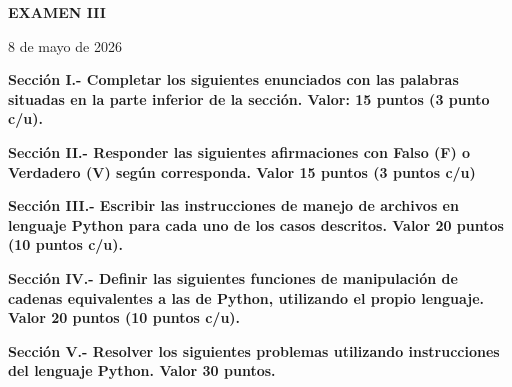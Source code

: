 \documentclass[10pt,addpoints]{exam}
\begin{document}
\begin{center}
  \sffamily\textbf{EXAMEN III}
\end{center}
\begin{flushright}
8 de mayo de 2026
\end{flushright}

\begin{questions}
\begin{EnvFullwidth}
  \sffamily\textbf{Sección I.- Completar los siguientes enunciados con las
  palabras situadas en la parte inferior de la sección. Valor: 15 puntos
  (3 punto c/u).}
\end{EnvFullwidth}








\end{questions}

\begin{questions}
\begin{EnvFullwidth}
  \sffamily\textbf{Sección II.- Responder las siguientes afirmaciones con
  Falso (F) o Verdadero (V) según corres\-ponda. Valor 15 puntos (3 puntos c/u)}
\end{EnvFullwidth}







\end{questions}


\begin{questions}
\begin{EnvFullwidth}
  \sffamily\textbf{Sección III.- Escribir las instrucciones de manejo de
  archivos en lenguaje Python para cada uno de los casos descritos. Valor 20
  puntos (10 puntos c/u).
  }
\end{EnvFullwidth}



%

\end{questions}

\begin{questions}
\begin{EnvFullwidth}
  \sffamily\textbf{Sección IV.- Definir las siguientes funciones de
  manipulación de cadenas equivalentes a las de Python, utilizando el propio
  lenguaje. Valor 20 puntos (10 puntos c/u).
  }
\end{EnvFullwidth}



%

\end{questions}

\begin{questions}
\begin{EnvFullwidth}
  \sffamily\textbf{Sección V.- Resolver los siguientes problemas utilizando
  instrucciones del lenguaje Python. Valor 30 puntos.
  }
\end{EnvFullwidth}


%
%

\end{questions}
\end{document}
